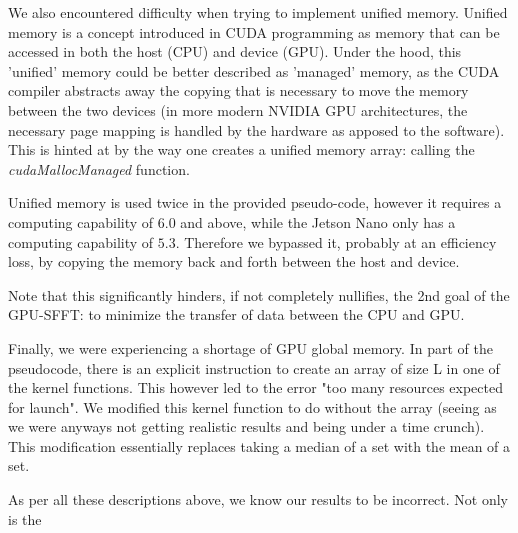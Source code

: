 We also encountered difficulty when trying to implement unified memory. Unified memory \cite{unifiedMemory} is a concept introduced in CUDA programming as memory that can be accessed in both the host (CPU) and device (GPU). Under the hood, this 'unified' memory could be better described as 'managed' memory, as the CUDA compiler abstracts away the copying that is necessary to move the memory between the two devices (in more modern NVIDIA GPU architectures, the necessary page mapping is handled by the hardware as apposed to the software). This is hinted at by the way one creates a unified memory array: calling the \textit{cudaMallocManaged} function. 

Unified memory is used twice in the provided pseudo-code, however it requires a computing capability of $6.0$ and above, while the Jetson Nano only has a computing capability of $5.3$. Therefore we bypassed it, probably at an efficiency loss, by copying the memory back and forth between the host and device.

Note that this significantly hinders, if not completely nullifies, the 2nd goal of the GPU-SFFT: to minimize the transfer of data between the CPU and GPU.

Finally, we were experiencing a shortage of GPU global memory. In part of the pseudocode, there is an explicit instruction to create an array of size L in one of the kernel functions. This however led to the error "too many resources expected for launch". We modified this kernel function to do without the array (seeing as we were anyways not getting realistic results and being under a time crunch). This modification essentially replaces taking a median of a set with the mean of a set.  

As per all these descriptions above, we know our results to be incorrect. Not only is the  